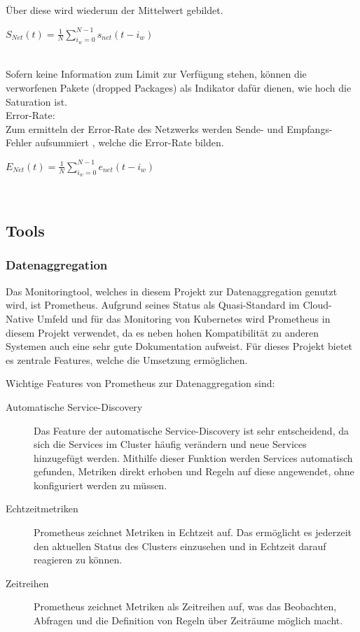 \documentclass[a4paper,10pt]{scrartcl}
\begin{document}
\begin{description}
Über diese wird wiederum der Mittelwert gebildet.

\begin{Huge}
\(
\displaystyle{S_{Net}(t)=\frac{1}{N}{\sum\limits_{i_{w}=0}^{N-1} s_{net}{(t-i_{w})}} }
\) 
\end{Huge}\\

Sofern keine Information zum Limit zur Verfügung stehen, können die verworfenen Pakete (dropped Packages) als Indikator dafür dienen, wie hoch die Saturation ist.\\



Error-Rate:\\
Zum ermitteln der Error-Rate des Netzwerks werden Sende- und Empfangs-Fehler aufsummiert , welche die Error-Rate bilden.

\begin{Huge}
\(
\displaystyle{E_{Net}(t)=\frac{1}{N}{\sum\limits_{i_{w}=0}^{N-1} e_{net}{(t-i_{w})}} }
\) 
\end{Huge}\\

\end{description}
\subsection{Tools}
\subsubsection{Datenaggregation}

Das Monitoringtool, welches in diesem Projekt zur Datenaggregation genutzt wird, ist Prometheus. Aufgrund seines Status als Quasi-Standard im Cloud-Native Umfeld und für das Monitoring von Kubernetes wird Prometheus in diesem Projekt verwendet, da es neben hohen Kompatibilität zu anderen Systemen auch eine sehr gute Dokumentation aufweist. Für dieses Projekt bietet es zentrale Features, welche die Umsetzung ermöglichen.

Wichtige Features von Prometheus zur Datenaggregation sind:
\begin{description}

\item[Automatische Service-Discovery]
Das Feature der automatische Service-Discovery ist sehr entscheidend, da sich die Services im Cluster häufig verändern und neue Services hinzugefügt werden. Mithilfe dieser Funktion werden Services automatisch gefunden, Metriken direkt erhoben und Regeln auf diese angewendet, ohne konfiguriert werden zu müssen.
\item[Echtzeitmetriken]
Prometheus zeichnet Metriken in Echtzeit auf. Das ermöglicht es jederzeit den aktuellen Status des Clusters einzusehen und in Echtzeit darauf reagieren zu können.
\item[Zeitreihen]
Prometheus zeichnet Metriken als Zeitreihen auf, was das Beobachten, Abfragen und die Definition von Regeln über Zeiträume möglich macht. 

\end{description}
\end{document}

